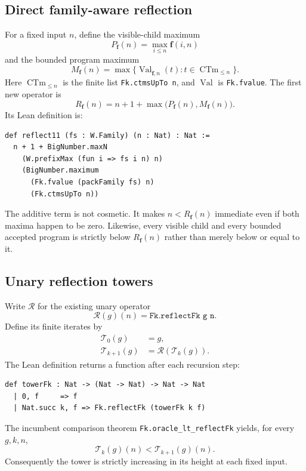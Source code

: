 \documentclass[11pt]{article}
\theoremstyle{definition}
\theoremstyle{remark}
\newcommand{\Rfam}{\ensuremath{R_{\mathbf f}}}
\newcommand{\code}[1]{\texttt{#1}}
\begin{document}
\subsection{Direct family-aware reflection}

For a fixed input $n$, define the visible-child maximum
\[
  P_{\mathbf f}(n)=\max_{i\le n}\mathbf f(i,n)
\]
and the bounded program maximum
\[
  M_{\mathbf f}(n)=
  \max\{\operatorname{Val}_{\widehat{\mathbf f},n}(t):
         t\in\operatorname{CTm}_{\le n}\}.
\]
Here $\operatorname{CTm}_{\le n}$ is the finite list \code{Fk.ctmsUpTo n}, and
$\operatorname{Val}$ is \code{Fk.fvalue}. The first new operator is
\begin{equation}
\label{eq:reflect11}
  \Rfam(n)=n+1+\max\bigl(P_{\mathbf f}(n),M_{\mathbf f}(n)\bigr).
\end{equation}
Its Lean definition is:

\begin{lstlisting}
def reflect11 (fs : W.Family) (n : Nat) : Nat :=
  n + 1 + BigNumber.maxN
    (W.prefixMax (fun i => fs i n) n)
    (BigNumber.maximum
      (Fk.fvalue (packFamily fs) n)
      (Fk.ctmsUpTo n))
\end{lstlisting}

The additive term is not cosmetic. It makes $n<\Rfam(n)$ immediate even if
both maxima happen to be zero. Likewise, every visible child and every bounded
accepted program is strictly below $\Rfam(n)$ rather than merely below or equal
to it.

\subsection{Unary reflection towers}

Write $\mathcal R$ for the existing unary operator
\[
  \mathcal R(g)(n)=\code{Fk.reflectFk g n}.
\]
Define its finite iterates by
\begin{align*}
  \mathcal T_0(g)&=g,\\
  \mathcal T_{k+1}(g)&=\mathcal R(\mathcal T_k(g)).
\end{align*}
The Lean definition returns a function after each recursion step:

\begin{lstlisting}
def towerFk : Nat -> (Nat -> Nat) -> Nat -> Nat
  | 0, f     => f
  | Nat.succ k, f => Fk.reflectFk (towerFk k f)
\end{lstlisting}

The incumbent comparison theorem
\code{Fk.oracle\_lt\_reflectFk} yields, for every $g,k,n$,
\begin{equation}
\label{eq:towerstep}
  \mathcal T_k(g)(n)<\mathcal T_{k+1}(g)(n).
\end{equation}
Consequently the tower is strictly increasing in its height at each fixed
input.
\end{document}
